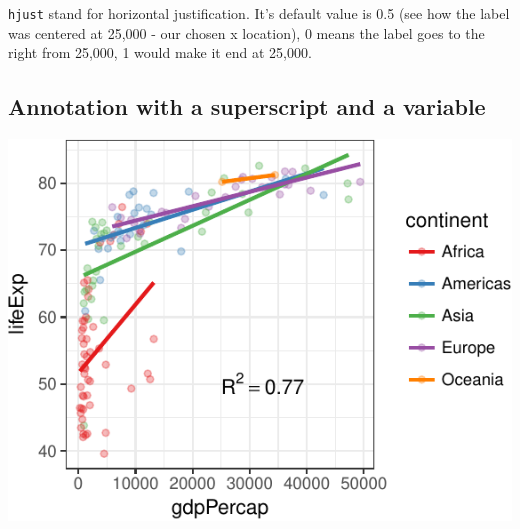 \documentclass[12pt,]{krantz}
\makeatletter
\newenvironment{Shaded}{\begin{snugshade}}{\end{snugshade}}
\newcommand{\DataTypeTok}[1]{\textcolor[rgb]{0.13,0.29,0.53}{#1}}
\newcommand{\DecValTok}[1]{\textcolor[rgb]{0.00,0.00,0.81}{#1}}
\newcommand{\FloatTok}[1]{\textcolor[rgb]{0.00,0.00,0.81}{#1}}
\newcommand{\KeywordTok}[1]{\textcolor[rgb]{0.13,0.29,0.53}{\textbf{#1}}}
\newcommand{\NormalTok}[1]{#1}
\newcommand{\OperatorTok}[1]{\textcolor[rgb]{0.81,0.36,0.00}{\textbf{#1}}}
\newcommand{\OtherTok}[1]{\textcolor[rgb]{0.56,0.35,0.01}{#1}}
\newcommand{\StringTok}[1]{\textcolor[rgb]{0.31,0.60,0.02}{#1}}
\newenvironment{kframe}{%
\medskip{}
\setlength{\fboxsep}{.8em}
 \def\at@end@of@kframe{}%
 \ifinner\ifhmode%
  \def\at@end@of@kframe{\end{minipage}}%
  \begin{minipage}{\columnwidth}%
 \fi\fi%
 \def\FrameCommand##1{\hskip\@totalleftmargin \hskip-\fboxsep
 \colorbox{shadecolor}{##1}\hskip-\fboxsep
     \hskip-\linewidth \hskip-\@totalleftmargin \hskip\columnwidth}%
 \MakeFramed {\advance\hsize-\width
   \@totalleftmargin\z@ \linewidth\hsize
   \@setminipage}}%
 {\par\unskip\endMakeFramed%
 \at@end@of@kframe}
\renewenvironment{Shaded}{\begin{kframe}}{\end{kframe}}
\theoremstyle{definition}
\theoremstyle{definition}
\theoremstyle{definition}
\theoremstyle{remark}
\makeatother
\begin{document}
\texttt{hjust} stand for horizontal justification. It's default value is
0.5 (see how the label was centered at 25,000 - our chosen x location),
0 means the label goes to the right from 25,000, 1 would make it end at
25,000.

\hypertarget{annotation-with-a-superscript-and-a-variable}{%
\subsection{Annotation with a superscript and a
variable}\label{annotation-with-a-superscript-and-a-variable}}

\begin{Shaded}
\end{Shaded}

\includegraphics{05_fine_tuning_plots_files/figure-latex/unnamed-chunk-18-1.pdf}
\end{document}

